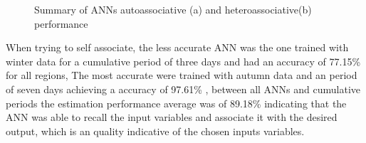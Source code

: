 \begin{figure}[htb!]
 \centering
 \caption{Summary of ANNs autoassociative (a) and heteroassociative(b) performance}
  \label{img:figure5}
\end{figure}


When trying to self associate, the less accurate ANN was the one trained with winter data for a cumulative period of three days and had an accuracy of 77.15\% for all regions, 
The most accurate were trained with autumn data and an period of seven days achieving a accuracy of 97.61\% , between all ANNs and cumulative periods the estimation performance average was of 89.18\% indicating that the ANN was able to recall the input variables and associate it with the desired output, which is an quality indicative of the chosen inputs variables.

